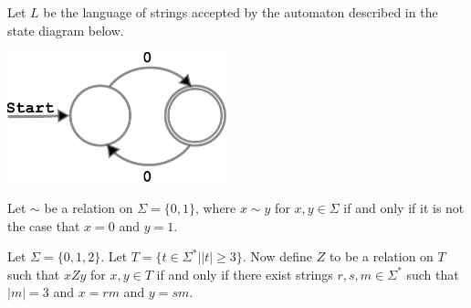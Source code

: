 \documentclass[addpoints]{exam}
\begin{document}
\begin{questions}
\clearpage
\question Let $L$ be the language of strings accepted by the automaton
described in the state diagram below.

\begin{center}
\includegraphics[width=2.5in, height=.75in,keepaspectratio=true]{oddzeroautomaton.pdf}
\end{center}     

\question Let $\sim$ be a relation on $\Sigma = \{0,1\}$, where $x\sim y$ for $x,y \in
\Sigma$ if and only if it is not the case that $x = 0$ and $y = 1$. 

\question
Let $\Sigma = \{0,1,2\}$.  Let $T = \{t \in \Sigma^* | |t| \geq 3\}$.
Now define $Z$ to be a relation on $T$ such that $xZy$ for $x,y \in T$ if and only if 
there exist strings $r,s,m \in \Sigma^*$ such that $|m| = 3$ and $x = rm$ and $y = sm$. 


\end{questions}
\end{document}
